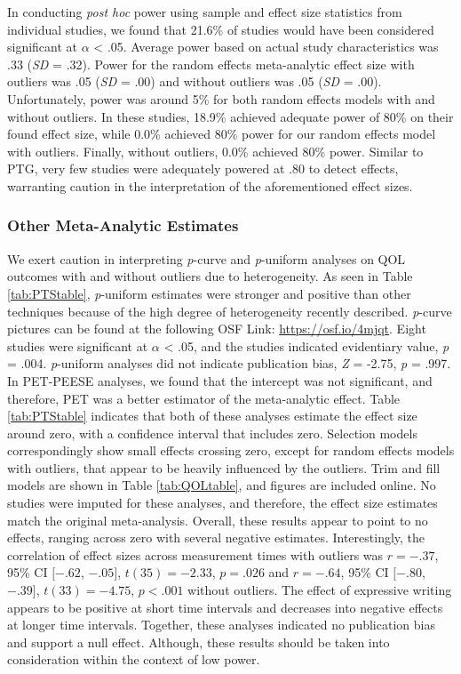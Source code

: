 \documentclass[man]{apa6}
\theoremstyle{definition}
\theoremstyle{definition}
\theoremstyle{definition}
\theoremstyle{remark}
\begin{document}
In conducting \emph{post hoc} power using sample and effect size
statistics from individual studies, we found that 21.6\% of studies
would have been considered significant at \(\alpha\) \textless{} .05.
Average power based on actual study characteristics was .33 (\emph{SD} =
.32). Power for the random effects meta-analytic effect size with
outliers was .05 (\emph{SD} = .00) and without outliers was .05
(\emph{SD} = .00). Unfortunately, power was around 5\% for both random
effects models with and without outliers. In these studies, 18.9\%
achieved adequate power of 80\% on their found effect size, while 0.0\%
achieved 80\% power for our random effects model with outliers. Finally,
without outliers, 0.0\% achieved 80\% power. Similar to PTG, very few
studies were adequately powered at .80 to detect effects, warranting
caution in the interpretation of the aforementioned effect sizes.

\subsubsection{Other Meta-Analytic
Estimates}\label{other-meta-analytic-estimates-2}

We exert caution in interpreting \emph{p}-curve and \emph{p}-uniform
analyses on QOL outcomes with and without outliers due to heterogeneity.
As seen in Table \ref{tab:PTStable}, \emph{p}-uniform estimates were
stronger and positive than other techniques because of the high degree
of heterogeneity recently described. \emph{p}-curve pictures can be
found at the following OSF Link: \url{https://osf.io/4mjqt}. Eight
studies were significant at \(\alpha\) \textless{} .05, and the studies
indicated evidentiary value, \emph{p} = .004. \emph{p}-uniform analyses
did not indicate publication bias, \emph{Z} = -2.75, \emph{p} = .997. In
PET-PEESE analyses, we found that the intercept was not significant, and
therefore, PET was a better estimator of the meta-analytic effect. Table
\ref{tab:PTStable} indicates that both of these analyses estimate the
effect size around zero, with a confidence interval that includes zero.
Selection models correspondingly show small effects crossing zero,
except for random effects models with outliers, that appear to be
heavily influenced by the outliers. Trim and fill models are shown in
Table \ref{tab:QOLtable}, and figures are included online. No studies
were imputed for these analyses, and therefore, the effect size
estimates match the original meta-analysis. Overall, these results
appear to point to no effects, ranging across zero with several negative
estimates. Interestingly, the correlation of effect sizes across
measurement times with outliers was \(r = -.37\), 95\% CI \([-.62\),
\(-.05]\), \(t(35) = -2.33\), \(p = .026\) and \(r = -.64\), 95\% CI
\([-.80\), \(-.39]\), \(t(33) = -4.75\), \(p < .001\) without outliers.
The effect of expressive writing appears to be positive at short time
intervals and decreases into negative effects at longer time intervals.
Together, these analyses indicated no publication bias and support a
null effect. Although, these results should be taken into consideration
within the context of low power.
\end{document}
